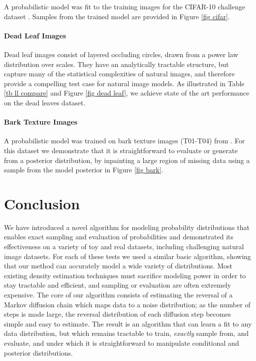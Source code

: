 \documentclass{article}
\begin{document}
A probabilistic model was fit to the training images for the CIFAR-10 challenge dataset \cite{Krizhevsky2009}. Samples from the trained model are provided in Figure \ref{fig cifar}.

\paragraph{Dead Leaf Images}

Dead leaf images \cite{Jeulin1997,Lee2001} consist of layered occluding circles, drawn from a power law distribution over scales. They have an analytically tractable structure, 
but capture many of the statistical complexities of natural images, and therefore provide a compelling test case for natural image models. 
As illustrated in Table \ref{tb ll compare} and Figure \ref{fig dead leaf}, we achieve state of the art performance on the dead leaves dataset.

\paragraph{Bark Texture Images}

A probabilistic model was trained on bark texture images (T01-T04) from \cite{lazebnik2005sparse}. For this dataset we demonstrate that 
it is straightforward to evaluate or generate from a posterior distribution, by inpainting a large region of missing data 
using a sample from the model posterior in Figure \ref{fig bark}.

\section{Conclusion}

We have introduced a novel algorithm for modeling probability distributions that enables exact sampling and evaluation of probabilities and demonstrated its effectiveness on a variety of toy and real datasets, including challenging natural image datasets. For each of these tests we used a similar basic algorithm, showing that our method can accurately model a wide variety of distributions. Most existing density estimation techniques must sacrifice modeling power in order to stay tractable and efficient, and sampling or evaluation are often extremely expensive. The core of our algorithm consists of estimating the reversal of a Markov diffusion chain which maps data to a noise distribution; as the number of steps is made large, the reversal distribution of each diffusion step becomes simple and easy to estimate. The result is an algorithm that can learn a fit to any data distribution, but which remains tractable to train, {\em exactly} sample from, and evaluate, and under which it is straightforward to manipulate conditional and posterior distributions.
\end{document}
